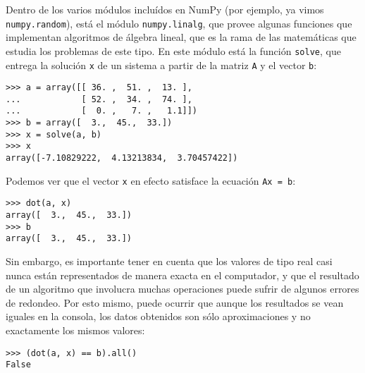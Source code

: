 Dentro de los varios módulos incluídos en NumPy (por ejemplo, ya vimos
\lstinline!numpy.random!), está el módulo \lstinline!numpy.linalg!, que
provee algunas funciones que implementan algoritmos de álgebra lineal,
que es la rama de las matemáticas que estudia los problemas de este
tipo. En este módulo está la función \lstinline!solve!, que entrega la
solución \lstinline!x! de un sistema a partir de la matriz \lstinline!A!
y el vector \lstinline!b!:

\begin{lstlisting}
>>> a = array([[ 36. ,  51. ,  13. ],
...            [ 52. ,  34. ,  74. ],
...            [  0. ,   7. ,   1.1]])
>>> b = array([  3.,  45.,  33.])
>>> x = solve(a, b)
>>> x
array([-7.10829222,  4.13213834,  3.70457422])
\end{lstlisting}

Podemos ver que el vector \lstinline!x! en efecto satisface la ecuación
\lstinline!Ax = b!:

\begin{lstlisting}
>>> dot(a, x)
array([  3.,  45.,  33.])
>>> b
array([  3.,  45.,  33.])
\end{lstlisting}

Sin embargo, es importante tener en cuenta que los valores de tipo real
casi nunca están representados de manera exacta en el computador, y que
el resultado de un algoritmo que involucra muchas operaciones puede
sufrir de algunos errores de redondeo. Por esto mismo, puede ocurrir que
aunque los resultados se vean iguales en la consola, los datos obtenidos
son sólo aproximaciones y no exactamente los mismos valores:

\begin{lstlisting}
>>> (dot(a, x) == b).all()
False
\end{lstlisting}

